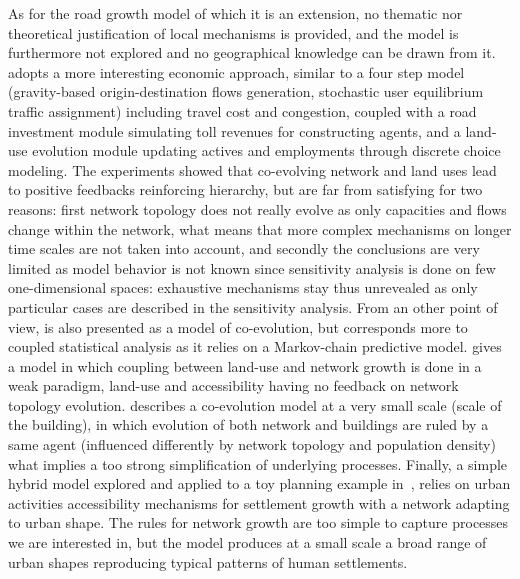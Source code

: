 {As for the road growth model of which it is an extension, no thematic nor theoretical justification of local mechanisms is provided, and the model is furthermore not explored and no geographical knowledge can be drawn from it. \cite{levinson2007co} adopts a more interesting economic approach, similar to a four step model (gravity-based origin-destination flows generation, stochastic user equilibrium traffic assignment) including travel cost and congestion, coupled with a road investment module simulating toll revenues for constructing agents, and a land-use evolution module updating actives and employments through discrete choice modeling. The experiments showed that co-evolving network and land uses lead to positive feedbacks reinforcing hierarchy, but are far from satisfying for two reasons: first network topology does not really evolve as only capacities and flows change within the network, what means that more complex mechanisms on longer time scales are not taken into account, and secondly the conclusions are very limited as model behavior is not known since sensitivity analysis is done on few one-dimensional spaces: exhaustive mechanisms stay thus unrevealed as only particular cases are described in the sensitivity analysis. From an other point of view, \cite{levinson2005paving} is also presented as a model of co-evolution, but corresponds more to coupled statistical analysis as it relies on a Markov-chain predictive model. \cite{rui2011urban} gives a model in which coupling between land-use and network growth is done in a weak paradigm, land-use and accessibility having no feedback on network topology evolution. \cite{achibet2014model} describes a co-evolution model at a very small scale (scale of the building), in which evolution of both network and buildings are ruled by a same agent (influenced differently by network topology and population density) what implies a too strong simplification of underlying processes. Finally, a simple hybrid model explored and applied to a toy planning example in~\cite{raimbault2014hybrid}, relies on urban activities accessibility mechanisms for settlement growth with a network adapting to urban shape. The rules for network growth are too simple to capture processes we are interested in, but the model produces at a small scale a broad range of urban shapes reproducing typical patterns of human settlements.
}{
}
